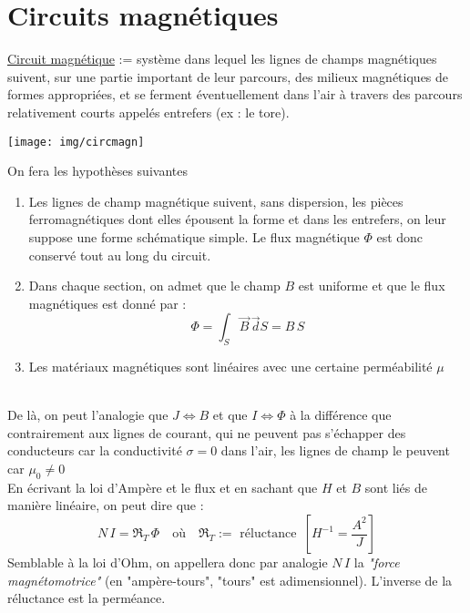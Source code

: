 \documentclass	[11pt, a4paper, openany]{book}
\begin{document}
	\section{Circuits magnétiques}
	\underline{Circuit magnétique} := système dans lequel les lignes de champs magnétiques suivent, sur une partie important de leur parcours, des milieux magnétiques de formes appropriées, et se ferment éventuellement dans l'air à travers des parcours relativement courts appelés entrefers (ex : le tore).\\\begin{center}\texttt{[image: img/circmagn]}\end{center}
	On fera les hypothèses suivantes \begin{enumerate}
	\item Les lignes de champ magnétique suivent, sans dispersion, les pièces ferromagnétiques dont elles épousent la forme et dans les entrefers, on leur suppose une forme schématique simple. Le flux magnétique $\Phi$ est donc conservé tout au long du circuit.
	\item Dans chaque section, on admet que le champ $B$ est uniforme et que le flux magnétiques est donné par :\begin{equation}
	\Phi=\int_S\vec B\,\vec dS=B\,S
	\end{equation}
	\item Les matériaux magnétiques sont linéaires avec une certaine perméabilité $\mu$
	\end{enumerate}\ \\
	De là, on peut l'analogie que $J\Leftrightarrow B$ et que $I\Leftrightarrow \Phi$ à la différence que contrairement aux lignes de courant, qui ne peuvent pas s'échapper des conducteurs car la conductivité $\sigma=0$  dans l'air, les lignes de champ le peuvent car $\mu_0\neq 0$\\
	
	En écrivant la loi d'Ampère et le flux et en sachant que $H$ et $B$ sont liés de manière linéaire, on peut dire que : \begin{equation}\label{relcircmagn}
	N\,I=\Re_T\,\Phi\quad\text{où}\quad\Re_T:=\text{ réluctance }\,\left[H^{-1}=\frac{A^2}{J}\right]
	\end{equation}
	Semblable à la loi d'Ohm, on appellera donc par analogie $N\,I$ la \textit{"force magnétomotrice"} (en "ampère-tours", "tours" est adimensionnel). L'inverse de la réluctance est la perméance.\\
	
\end{document}
